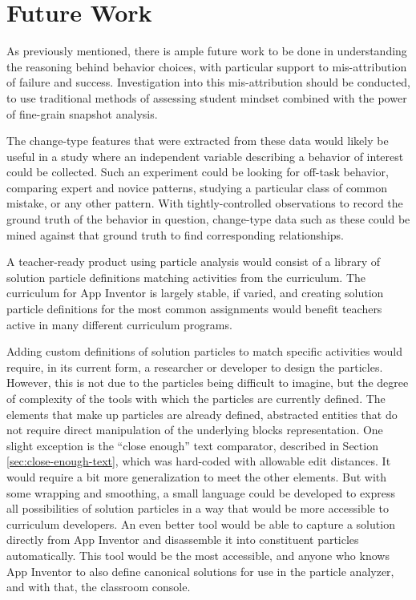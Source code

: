 
\section{Future Work}
\label{sec:futurework}

As previously mentioned, there is ample future work to be done in understanding the reasoning behind behavior choices, with particular support to mis-attribution of failure and success. Investigation into this mis-attribution should be conducted, to use traditional methods of assessing student mindset combined with the power of fine-grain snapshot analysis. 

The change-type features that were extracted from these data would likely be useful in a study where an independent variable describing a behavior of interest could be collected. Such an experiment could be looking for off-task behavior, comparing expert and novice patterns, studying a particular class of common mistake, or any other pattern. With tightly-controlled observations to record the ground truth of the behavior in question, change-type data such as these could be mined against that ground truth to find corresponding relationships. 

A teacher-ready product using particle analysis would consist of a library of solution particle definitions matching activities from the curriculum. The curriculum for App Inventor is largely stable, if varied, and creating solution particle definitions for the most common assignments would benefit teachers active in many different curriculum programs. 

Adding custom definitions of solution particles to match specific activities would require, in its current form, a researcher or developer to design the particles. However, this is not due to the particles being difficult to imagine, but the degree of complexity of the tools with which the particles are currently defined. The elements that make up particles are already defined, abstracted entities that do not require direct manipulation of the underlying blocks representation. One slight exception is the ``close enough'' text comparator, described in Section \ref{sec:close-enough-text}, which was hard-coded with allowable edit distances. It would require a bit more generalization to meet the other elements. But with some wrapping and smoothing, a small language could be developed to express all possibilities of solution particles in a way that would be more accessible to curriculum developers. An even better tool would be able to capture a solution directly from App Inventor and disassemble it into constituent particles automatically. This tool would be the most accessible, and anyone who knows App Inventor to also define canonical solutions for use in the particle analyzer, and with that, the classroom console. 

